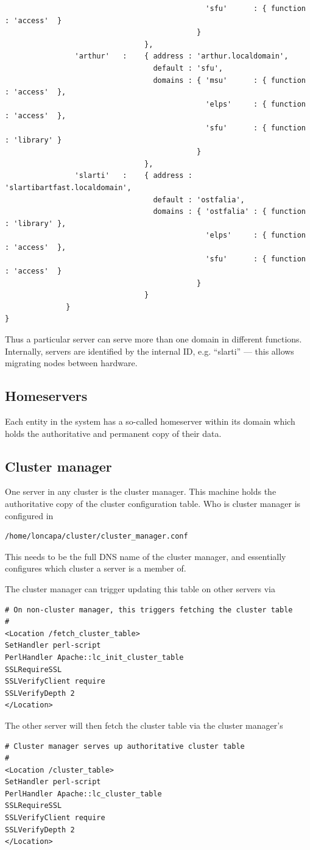 \begin{verbatim}
                                              'sfu'      : { function : 'access'  }
                                            }
                                },
                'arthur'   :    { address : 'arthur.localdomain',
                                  default : 'sfu',
                                  domains : { 'msu'      : { function : 'access'  },
                                              'elps'     : { function : 'access'  },
                                              'sfu'      : { function : 'library' }
                                            }
                                },
                'slarti'   :    { address : 'slartibartfast.localdomain',
                                  default : 'ostfalia',
                                  domains : { 'ostfalia' : { function : 'library' },
                                              'elps'     : { function : 'access'  },
                                              'sfu'      : { function : 'access'  }
                                            }
                                }
              }
}
\end{verbatim}
Thus a particular server can serve more than one domain in different functions. Internally, servers are identified by the internal ID, e.g. ``slarti'' --- this allows migrating nodes between hardware.
\subsection{Homeservers}\label{homeserver}
Each entity in the system has a so-called homeserver within its domain which holds the authoritative and permanent copy of their data.
\subsection{Cluster manager}
One server in any cluster is the cluster manager. This machine holds the authoritative copy of the cluster configuration table. 
Who is cluster manager is configured in
\begin{verbatim}
/home/loncapa/cluster/cluster_manager.conf
\end{verbatim}
This needs to be the full DNS name of the cluster manager, and essentially configures which cluster a server is a member of.

The cluster manager can trigger updating this table on other servers via
\begin{verbatim}
# On non-cluster manager, this triggers fetching the cluster table
#
<Location /fetch_cluster_table>
SetHandler perl-script
PerlHandler Apache::lc_init_cluster_table
SSLRequireSSL
SSLVerifyClient require
SSLVerifyDepth 2
</Location>
\end{verbatim}
The other server will then fetch the cluster table via the cluster manager's
\begin{verbatim}
# Cluster manager serves up authoritative cluster table
#
<Location /cluster_table>
SetHandler perl-script
PerlHandler Apache::lc_cluster_table
SSLRequireSSL
SSLVerifyClient require
SSLVerifyDepth 2
</Location>
\end{verbatim}

